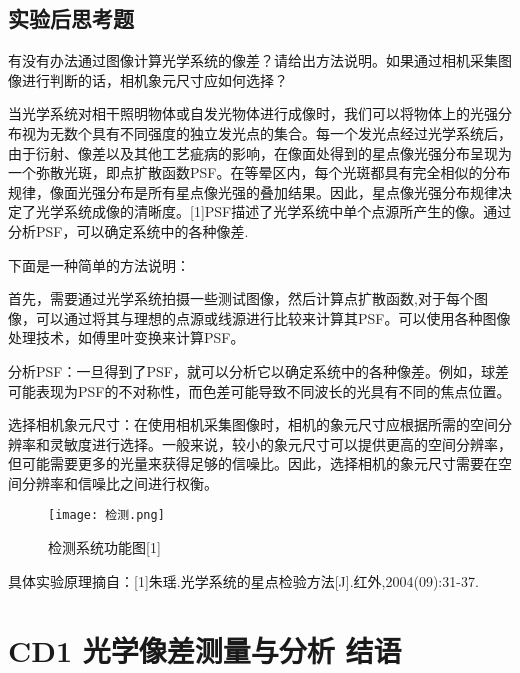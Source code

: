 \documentclass[dvipsnames, svgnames,a4paper,11pt]{article}
\begin{document}
	
	
	
	\subsection{实验后思考题}
	
	\begin{question}
		有没有办法通过图像计算光学系统的像差？请给出方法说明。如果通过相机采集图像进行判断的话，相机象元尺寸应如何选择？
	\end{question}
	当光学系统对相干照明物体或自发光物体进行成像时，我们可以将物体上的光强分布视为无数个具有不同强度的独立发光点的集合。每一个发光点经过光学系统后，由于衍射、像差以及其他工艺疵病的影响，在像面处得到的星点像光强分布呈现为一个弥散光斑，即点扩散函数PSF。在等晕区内，每个光斑都具有完全相似的分布规律，像面光强分布是所有星点像光强的叠加结果。因此，星点像光强分布规律决定了光学系统成像的清晰度。[1]PSF描述了光学系统中单个点源所产生的像。通过分析PSF，可以确定系统中的各种像差.

下面是一种简单的方法说明：

首先，需要通过光学系统拍摄一些测试图像，然后计算点扩散函数,对于每个图像，可以通过将其与理想的点源或线源进行比较来计算其PSF。可以使用各种图像处理技术，如傅里叶变换来计算PSF。

分析PSF：一旦得到了PSF，就可以分析它以确定系统中的各种像差。例如，球差可能表现为PSF的不对称性，而色差可能导致不同波长的光具有不同的焦点位置。

选择相机象元尺寸：在使用相机采集图像时，相机的象元尺寸应根据所需的空间分辨率和灵敏度进行选择。一般来说，较小的象元尺寸可以提供更高的空间分辨率，但可能需要更多的光量来获得足够的信噪比。因此，选择相机的象元尺寸需要在空间分辨率和信噪比之间进行权衡。
\begin{figure}[{H}]
	\centering
	\texttt{[image: 检测.png]}
	\caption{检测系统功能图[1]}
	\label{}
\end{figure}
具体实验原理摘自：[1]朱瑶.光学系统的星点检验方法[J].红外,2004(09):31-37.

	\clearpage
	
	\section{CD1 光学像差测量与分析 \quad\heiti 结语}
	
\end{document}
